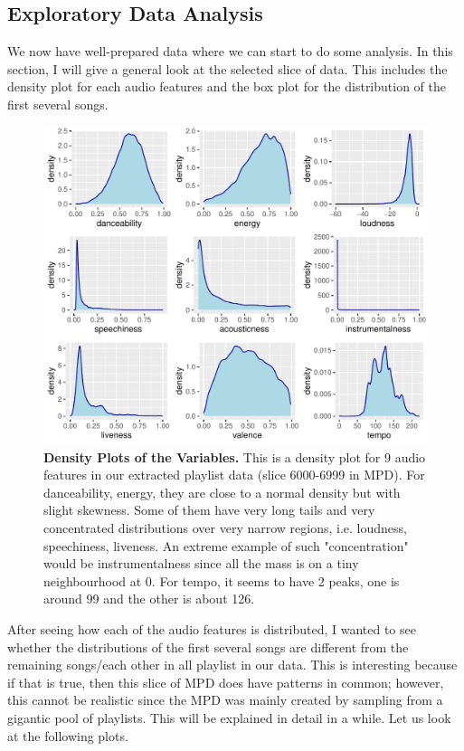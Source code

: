 \documentclass[12pt]{article}
\theoremstyle{plain}
\theoremstyle{definition}
\theoremstyle{remark}
\begin{document}
\newpage
\subsection{Exploratory Data Analysis}
We now have well-prepared data where we can start to do some analysis. In this section, I will give a general look at the selected slice of data. This includes the density plot for each audio features and the box plot for the distribution of the first several songs. 

\begin{figure}[htp]
    \centering
    \includegraphics[width=\textwidth]{Images/density.pdf}
    \caption{\textbf{Density Plots of the Variables.} This is a density plot for 9 audio features in our extracted playlist data (slice 6000-6999 in MPD). For danceability, energy, they are close to a normal density but with slight skewness. Some of them have very long tails and very concentrated distributions over very narrow regions, i.e. loudness, speechiness, liveness. An extreme example of such "concentration" would be instrumentalness since all the mass is on a tiny neighbourhood at 0. For tempo, it seems to have 2 peaks, one is around 99 and the other is about 126.}
    \label{fig:Density}
\end{figure}



After seeing how each of the audio features is distributed, I wanted to see whether the distributions of the first several songs are different from the remaining songs/each other in all playlist in our data. This is interesting because if that is true, then this slice of MPD does have patterns in common; however, this cannot be realistic since the MPD was mainly created by sampling from a gigantic pool of playlists. This will be explained in detail in a while. Let us look at the following plots.
\end{document}

